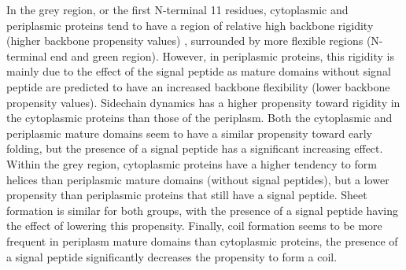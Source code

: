 
In the grey region, or the first N-terminal 11 residues,
cytoplasmic and periplasmic proteins tend to have a region of relative high backbone rigidity (higher backbone propensity values) , 
surrounded by more flexible regions (N-terminal end and green region).
However, in periplasmic proteins, this rigidity is mainly due to the effect of the signal peptide 
as mature domains without signal peptide are predicted to have an increased backbone flexibility (lower backbone propensity values).
Sidechain dynamics has a higher propensity toward rigidity in the cytoplasmic proteins than those of the periplasm.
Both the cytoplasmic and periplasmic mature domains seem to have a similar propensity toward early folding,
but the presence of a signal peptide has a significant increasing effect.
Within the grey region,
cytoplasmic proteins have a higher tendency to form helices than periplasmic mature domains (without signal peptides),
but a lower propensity than periplasmic proteins that still have a signal peptide.
Sheet formation is similar for both groups,
with the presence of a signal peptide having the effect of lowering this propensity.
Finally, coil formation seems to be more frequent in periplasm mature domains than cytoplasmic proteins,
the presence of a signal peptide significantly decreases the propensity to form a coil.
